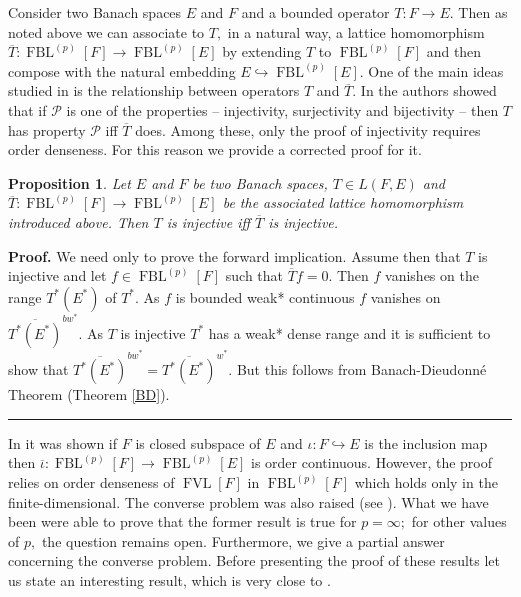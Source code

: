 \documentclass[12pt]{article}%
\newtheorem{proposition}[theorem]{Proposition}
\newenvironment{proof}[1][Proof]{\noindent\textbf{#1.} }{\ \rule{0.5em}{0.5em}}
\begin{document}
Consider two Banach spaces $E$ and $F$ and a bounded operator
$T:F\longrightarrow E.$ Then as noted above we can associate to $T,$ in a
natural way, a lattice homomorphism $\overline{T}:\operatorname*{FBL}%
\nolimits^{(p)}\left[  F\right]  \longrightarrow\operatorname*{FBL}%
\nolimits^{(p)}\left[  E\right]  $ by extending $T$ to $\operatorname*{FBL}%
\nolimits^{(p)}\left[  F\right]  $ and then compose with the natural embedding
$E\hookrightarrow\operatorname*{FBL}\nolimits^{(p)}\left[  E\right]  .$ One of
the main ideas studied in \cite{L-925} is the relationship between operators
$T$ and $\overline{T}.$ In \cite{L-925} the authors showed that if
$\mathcal{P}$ is one of the properties -- injectivity, surjectivity and
bijectivity -- then $T$ has property $\mathcal{P}$ iff $\overline{T}$ does.
Among these, only the proof of injectivity requires order denseness. For this
reason we provide a corrected proof for it.

\begin{proposition}
Let $E$ and $F$ be two Banach spaces, $T\in L\left(  F,E\right)  $ and
$\overline{T}:\operatorname*{FBL}\nolimits^{(p)}\left[  F\right]
\longrightarrow\operatorname*{FBL}\nolimits^{(p)}\left[  E\right]  $ be the
associated lattice homomorphism introduced above. Then $T$ is injective iff
$\overline{T}$ is injective.
\end{proposition}

\begin{proof}
We need only to prove the forward implication. Assume then that $T$ is
injective and let $f\in\operatorname*{FBL}\nolimits^{(p)}\left[  F\right]  $
such that $\overline{T}f=0.$ Then $f$ vanishes on the range $T^{\ast}\left(
E^{\ast}\right)  $ of $T^{\ast}.$ As $f$ is bounded weak* continuous $f$
vanishes on $\overline{T^{\ast}\left(  E^{\ast}\right)  }^{bw^{\ast}}.$ As $T$
is injective $T^{\ast}$ has a weak* dense range and it is sufficient to show
that $\overline{T^{\ast}\left(  E^{\ast}\right)  }^{bw^{\ast}}=\overline
{T^{\ast}\left(  E^{\ast}\right)  }^{w^{\ast}}.$ But this follows from
Banach-Dieudonn\'{e} Theorem (Theorem \ref{BD}).
\end{proof}

In \cite[Theorem 3.4]{L-925} it was shown if $F$ is closed subspace of $E$ and
$\iota:F\hookrightarrow E$ is the inclusion map then $\overline{\iota
}:\operatorname*{FBL}\nolimits^{(p)}\left[  F\right]  \longrightarrow
\operatorname*{FBL}\nolimits^{(p)}\left[  E\right]  $ is order continuous.
However, the proof relies on order denseness of $\operatorname*{FVL}\left[
F\right]  $ in $\operatorname*{FBL}\nolimits^{(p)}\left[  F\right]  $ which
holds only in the finite-dimensional. The converse problem was also raised
(see \cite[Remark 3.5]{L-925}). What we have been were able to prove that the
former result is true for $p=\infty;$ for other values of $p,$ the question
remains open. Furthermore, we give a partial answer concerning the converse
problem. Before presenting the proof of these results let us state an
interesting result, which is very close to \cite[Lemma 2.9]{L-925}.
\end{document}
